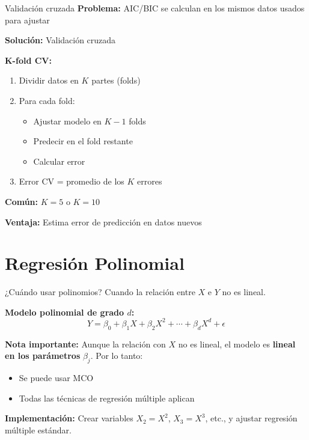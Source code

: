 \documentclass[aspectratio=169]{beamer}
\begin{document}
\begin{frame}{Validación cruzada}
\textbf{Problema:} AIC/BIC se calculan en los mismos datos usados para ajustar

\vspace{0.3cm}
\textbf{Solución:} Validación cruzada

\vspace{0.3cm}
\textbf{K-fold CV:}
\begin{enumerate}
    \item Dividir datos en $K$ partes (folds)
    \item Para cada fold:
    \begin{itemize}
        \item Ajustar modelo en $K-1$ folds
        \item Predecir en el fold restante
        \item Calcular error
    \end{itemize}
    \item Error CV = promedio de los $K$ errores
\end{enumerate}

\vspace{0.3cm}
\textbf{Común:} $K = 5$ o $K = 10$

\vspace{0.3cm}
\textbf{Ventaja:} Estima error de predicción en datos nuevos
\end{frame}

\section{Regresión Polinomial}

\begin{frame}{¿Cuándo usar polinomios?}
Cuando la relación entre $X$ e $Y$ no es lineal.

\vspace{0.3cm}
\textbf{Modelo polinomial de grado $d$:}
\[
Y = \beta_0 + \beta_1 X + \beta_2 X^2 + \cdots + \beta_d X^d + \epsilon
\]

\vspace{0.5cm}
\textbf{Nota importante:} Aunque la relación con $X$ no es lineal, el modelo es \textbf{lineal en los parámetros} $\beta_j$. Por lo tanto:
\begin{itemize}
    \item Se puede usar MCO
    \item Todas las técnicas de regresión múltiple aplican
\end{itemize}

\vspace{0.3cm}
\textbf{Implementación:} Crear variables $X_2 = X^2$, $X_3 = X^3$, etc., y ajustar regresión múltiple estándar.
\end{frame}
\end{document}
